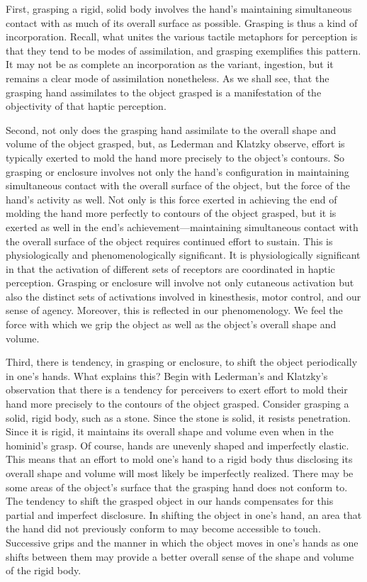 \documentclass[12pt]{article}
\begin{document}
First, grasping a rigid, solid body involves the hand's maintaining simultaneous contact with as much of its overall surface as possible. Grasping is thus a kind of incorporation. Recall, what unites the various tactile metaphors for perception is that they tend to be modes of assimilation, and grasping exemplifies this pattern. It may not be as complete an incorporation as the variant, ingestion, but it remains a clear mode of assimilation nonetheless. As we shall see, that the grasping hand assimilates to the object grasped is a manifestation of the objectivity of that haptic perception. 

Second, not only does the grasping hand assimilate to the overall shape and volume of the object grasped, but, as Lederman and Klatzky observe, effort is typically exerted to mold the hand more precisely to the object's contours. So grasping or enclosure involves not only the hand's configuration in maintaining simultaneous contact with the overall surface of the object, but the force of the hand's activity as well. Not only is this force exerted in achieving the end of molding the hand more perfectly to contours of the object grasped, but it is exerted as well in the end's achievement---maintaining simultaneous contact with the overall surface of the object requires continued effort to sustain. This is physiologically and phenomenologically significant. It is physiologically significant in that the activation of different sets of receptors are coordinated in haptic perception. Grasping or enclosure will involve not only cutaneous activation but also the distinct sets of activations involved in kinesthesis, motor control, and our sense of agency. Moreover, this is reflected in our phenomenology. We feel the force with which we grip the object as well as the object's overall shape and volume.

Third, there is tendency, in grasping or enclosure, to shift the object periodically in one's hands. What explains this? Begin with Lederman's and Klatzky's observation that there is a tendency for perceivers to exert effort to mold their hand more precisely to the contours of the object grasped. Consider grasping a solid, rigid body, such as a stone. Since the stone is solid, it resists penetration. Since it is rigid, it maintains its overall shape and volume even when in the hominid's grasp. Of course, hands are unevenly shaped and imperfectly elastic. This means that an effort to mold one's hand to a rigid body thus disclosing its overall shape and volume will most likely be imperfectly realized. There may be some areas of the object's surface that the grasping hand does not conform to. The tendency to shift the grasped object in our hands compensates for this partial and imperfect disclosure. In shifting the object in one's hand, an area that the hand did not previously conform to may become accessible to touch. Successive grips and the manner in which the object moves in one's hands as one shifts between them may provide a better overall sense of the shape and volume of the rigid body. 
\end{document}

